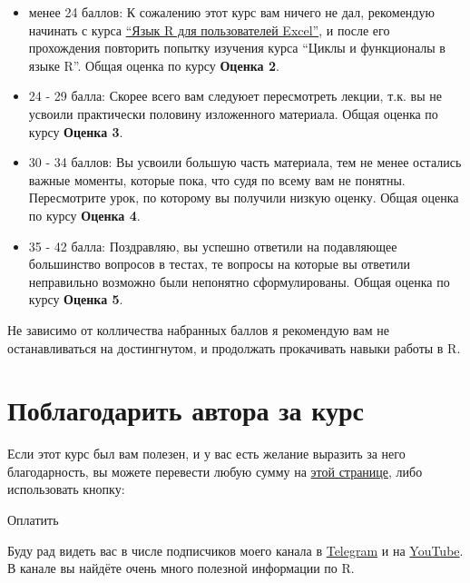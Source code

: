 \documentclass[
]{book}
\providecommand{\tightlist}{%
  \setlength{\itemsep}{0pt}\setlength{\parskip}{0pt}}
\begin{document}
\begin{itemize}
\tightlist
\item
  менее 24 баллов: К сожалению этот курс вам ничего не дал, рекомендую начинать с курса \href{https://selesnow.github.io/r4excel_users/}{``Язык R для пользователей Excel''}, и после его прохождения повторить попытку изучения курса ``Циклы и функционалы в языке R''. Общая оценка по курсу \textbf{Оценка 2}.
\item
  24 - 29 балла: Скорее всего вам следуюет пересмотреть лекции, т.к. вы не усвоили практически половину изложенного материала. Общая оценка по курсу \textbf{Оценка 3}.
\item
  30 - 34 баллов: Вы усвоили большую часть материала, тем не менее остались важные моменты, которые пока, что судя по всему вам не понятны. Пересмотрите урок, по которому вы получили низкую оценку. Общая оценка по курсу \textbf{Оценка 4}.
\item
  35 - 42 балла: Поздравляю, вы успешно ответили на подавляющее большинство вопросов в тестах, те вопросы на которые вы ответили неправильно возможно были непонятно сформулированы. Общая оценка по курсу \textbf{Оценка 5}.
\end{itemize}

Не зависимо от колличества набранных баллов я рекомендую вам не останавливаться на достингнутом, и продолжать прокачивать навыки работы в R.

\hypertarget{ux43fux43eux431ux43bux430ux433ux43eux434ux430ux440ux438ux442ux44c-ux430ux432ux442ux43eux440ux430-ux437ux430-ux43aux443ux440ux441}{%
\section*{Поблагодарить автора за курс}\label{ux43fux43eux431ux43bux430ux433ux43eux434ux430ux440ux438ux442ux44c-ux430ux432ux442ux43eux440ux430-ux437ux430-ux43aux443ux440ux441}}

Если этот курс был вам полезен, и у вас есть желание выразить за него благодарность, вы можете перевести любую сумму на \href{https://secure.wayforpay.com/payment/iteractions_in_r}{этой странице}, либо использовать кнопку:

{Оплатить}

Буду рад видеть вас в числе подписчиков моего канала в \href{https://t.me/R4marketing}{Telegram} и на \href{https://www.youtube.com/R4marketing/?sub_confirmation=1}{YouTube}. В канале вы найдёте очень много полезной информации по R.
\end{document}
